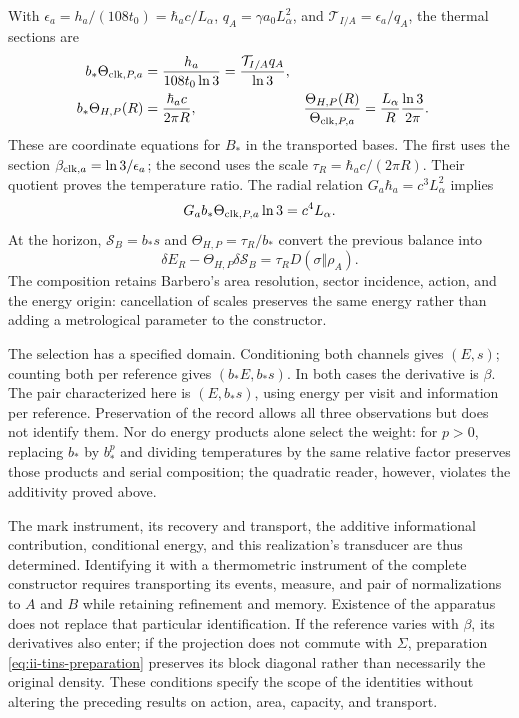 With $\epsilon_a=h_a/(108t_0)=\hbar_ac/L_\alpha$,
$q_A=\gamma a_0L_\alpha^2$, and
$\mathcal T_{I/A}=\epsilon_a/q_A$, the thermal sections are
\begin{align}
 b_*\Theta_{{\rm clk},P,a}
 &=\frac{h_a}{108t_0\ln3}
 =\frac{\mathcal T_{I/A}q_A}{\ln3},\nonumber\\
 b_*\Theta_{H,P}(R)&=\frac{\hbar_ac}{2\pi R},&
 \frac{\Theta_{H,P}(R)}{\Theta_{{\rm clk},P,a}}
 &=\frac{L_\alpha}{R}\frac{\ln3}{2\pi}.
 \label{eq:ii-tins-action-area}
\end{align}
These are coordinate equations for $B_*$ in the transported bases.
The first uses the section $\beta_{{\rm clk},a}=\ln3/\epsilon_a$;
the second uses the scale $\tau_R=\hbar_ac/(2\pi R)$. Their quotient
proves the temperature ratio. The radial relation
$G_a\hbar_a=c^3L_\alpha^2$ implies
\begin{equation}
 G_ab_*\Theta_{{\rm clk},P,a}\ln3=c^4L_\alpha.
 \label{eq:ii-tins-gravity}
\end{equation}
At the horizon, $\mathcal S_B=b_*s$ and
$\Theta_{H,P}=\tau_R/b_*$ convert the previous balance into
\[
 \delta E_R-\Theta_{H,P}\delta\mathcal S_B
 =\tau_RD(\sigma\Vert\rho_A).
\]
The composition retains Barbero's area resolution, sector incidence,
action, and the energy origin: cancellation of scales preserves the same
energy rather than adding a metrological parameter to the constructor.

The selection has a specified domain. Conditioning both channels gives
$(E,s)$; counting both per reference gives $(b_*E,b_*s)$. In both cases
the derivative is $\beta$. The pair characterized here is $(E,b_*s)$,
using energy per visit and information per reference. Preservation of
the record allows all three observations but does not identify them.
Nor do energy products alone select the weight: for $p>0$, replacing
$b_*$ by $b_*^p$ and dividing temperatures by the same relative factor
preserves those products and serial composition; the quadratic reader,
however, violates the additivity proved above.

The mark instrument, its recovery and transport, the additive informational
contribution, conditional energy, and this realization's transducer are
thus determined. Identifying it with a thermometric instrument of the
complete constructor requires transporting its events, measure, and pair
of normalizations to $A$ and $B$ while retaining refinement and memory.
Existence of the apparatus does not replace that particular identification.
If the reference varies with $\beta$, its derivatives also enter; if the
projection does not commute with $\Sigma$, preparation
\eqref{eq:ii-tins-preparation} preserves its block diagonal rather than
necessarily the original density. These conditions specify the scope
of the identities without altering the preceding results on action,
area, capacity, and transport.
